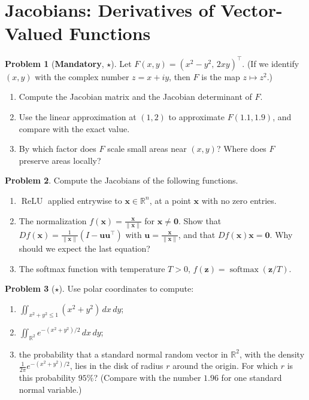 \documentclass[11pt]{article}
\theoremstyle{definition}
\newtheorem{problem}{Problem}[section]
\newcommand{\mandatory}{\textcolor{red!70!black}{\textbf{Mandatory}}}
\newcommand{\norm}[1]{\lVert #1 \rVert}
\DeclareMathOperator{\softmax}{softmax}
\DeclareMathOperator{\ReLU}{ReLU}
\begin{document}
\section{Jacobians: Derivatives of Vector-Valued Functions}

\begin{problem}[\mandatory, $\star$]\label{pr:jacobian-squaring}
    Let $F(x, y) = (x^2 - y^2, \, 2xy)^\top$. (If we identify $(x, y)$ with the complex number $z = x + iy$, then $F$ is the map $z \mapsto z^2$.)
    \begin{enumerate}[label=(\alph*)]
        \item Compute the Jacobian matrix and the Jacobian determinant of $F$.
        \item Use the linear approximation at $(1, 2)$ to approximate $F(1.1, 1.9)$, and compare with the exact value.
        \item By which factor does $F$ scale small areas near $(x, y)$? Where does $F$ preserve areas locally?
    \end{enumerate}
\end{problem}

\begin{problem}\label{pr:jacobians-ml}
    Compute the Jacobians of the following functions.
    \begin{enumerate}[label=(\alph*)]
        \item $\ReLU$ applied entrywise to $\mathbf{x} \in \mathbb{R}^n$, at a point $\mathbf{x}$ with no zero entries.
        \item The normalization $f(\mathbf{x}) = \frac{\mathbf{x}}{\norm{\mathbf{x}}}$ for $\mathbf{x} \neq \mathbf{0}$. Show that $Df(\mathbf{x}) = \frac{1}{\norm{\mathbf{x}}}(I - \mathbf{u}\mathbf{u}^\top)$ with $\mathbf{u} = \frac{\mathbf{x}}{\norm{\mathbf{x}}}$, and that $Df(\mathbf{x})\mathbf{x} = \mathbf{0}$. Why should we expect the last equation?
        \item The softmax function with temperature $T > 0$, $f(\mathbf{z}) = \softmax(\mathbf{z}/T)$.
    \end{enumerate}
\end{problem}

\begin{problem}[$\star$]\label{pr:polar-integrals}
    Use polar coordinates to compute:
    \begin{enumerate}[label=(\alph*)]
        \item $\iint_{x^2 + y^2 \leq 1} (x^2 + y^2) \, dx \, dy$;
        \item $\iint_{\mathbb{R}^2} e^{-(x^2 + y^2)/2} \, dx \, dy$;
        \item the probability that a standard normal random vector in $\mathbb{R}^2$, with the density $\frac{1}{2\pi}e^{-(x^2 + y^2)/2}$, lies in the disk of radius $r$ around the origin. For which $r$ is this probability $95\%$? (Compare with the number $1.96$ for one standard normal variable.)
    \end{enumerate}
\end{problem}
\end{document}
